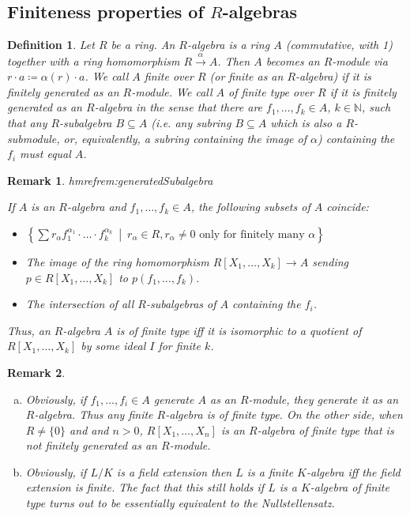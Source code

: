 \documentclass[DIV=14,parskip=full,pointednumbers]{scrartcl}
\theoremstyle{cthm}
\theoremstyle{cdef}
\newtheorem{defi}{Definition}[subsection]
\newtheorem{rem}{Remark}[subsection]
\newcommand{\lbl}[1]{
	\label{#1}
	\edef\dummy{\curthm}
	\expandafter\xdef\csname thmref#1\endcsname{\dummy}
}
\newcommand{\IN}{\mathbb{N}}
\newcommand{\longto}{\longrightarrow}
\newcommand{\st}{\ \middle|\ }
\begin{document}
\subsection{Finiteness properties of $R$-algebras}
\begin{defi}
 Let $R$ be a ring. An \emph{$R$-algebra} is a ring $A$ (commutative, with 1) together with a ring homomorphism $R\overset{\alpha}{\longto} A$. Then $A$ becomes an $R$-module via $r\cdot a \coloneqq \alpha(r) \cdot a$. We call $A$ \emph{finite over $R$} (or \emph{finite as an $R$-algebra}) if it is finitely generated as an $R$-module. We call $A$ of \emph{finite type over $R$} if it is finitely generated as an $R$-algebra in the sense that there are $f_1,\ldots, f_k\in A$, $k\in \IN$, such that any $R$-subalgebra $B\subseteq A$ (i.e. any subring $B\subseteq A$ which is also a $R$-submodule, or, equivalently, a subring containing the image of $\alpha$) containing the $f_i$ must equal $A$.
\end{defi}
\begin{rem}\lbl{rem:generatedSubalgebra}
 If $A$ is an $R$-algebra and $f_1,\ldots,f_k\in A$, the following subsets of $A$ coincide:
 \begin{itemize}
  \item $\left\{\sum r_\alpha f_1^{\alpha_1}\cdot\ldots\cdot f_k^{\alpha_k}\st r_\alpha\in R, r_\alpha\neq 0 \text{ only for finitely many } \alpha\right\}$
  \item The image of the ring homomorphism $R[X_1,\ldots,X_k]\to A$ sending $p\in R[X_1,\ldots, X_k]$ to $p(f_1,\ldots,f_k)$.
  \item The intersection of all $R$-subalgebras of $A$ containing the $f_i$.
 \end{itemize}
Thus, an $R$-algebra $A$ is of finite type iff it is isomorphic to a quotient of $R[X_1,\ldots, X_k]$ by some ideal $I$ for finite $k$.
\end{rem}
\begin{rem}
\begin{enumerate}[a)]
 \item Obviously, if $f_1,\ldots, f_i\in A$ generate $A$ as an $R$-module, they generate it as an $R$-algebra. Thus any finite $R$-algebra is of finite type. On the other side, when $R\neq \{0\}$ and and $n>0$, $R[X_1, \ldots, X_n]$ is an $R$-algebra of finite type that is not finitely generated as an $R$-module.
\item Obviously, if $L/K$ is a field extension then $L$ is a finite $K$-algebra iff the field extension is finite. The fact that this still holds if $L$ is a $K$-algebra of finite type turns out to be essentially equivalent to the Nullstellensatz.
 \end{enumerate}

\end{rem}
\end{document}
